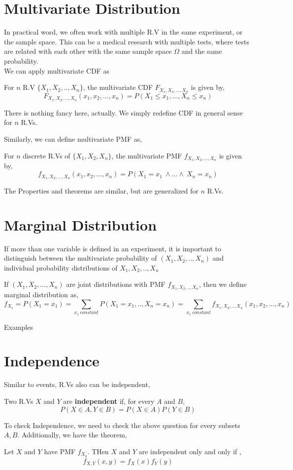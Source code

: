 \section{Multivariate Distribution}
In practical word, we often work with multiple R.V in the same experiment, or the sample space. This can be a medical research with multiple tests, where tests are related with each other with the same sample space $\Omega$ and the same probability.\\
We can apply multivariate CDF as
\begin{definition}
    For $n$  R.V $\{ X_1,X_2,..,X_n \}$, the multivariate CDF $F_{X_1,X_2,...,X_n}$ is given by,
    \[F_{X_1,X_2,...,X_n}(x_1,x_2,...,x_n) = P(X_1 \le x_1,...,X_n \le x_n) \]
\end{definition}
There is nothing fancy here, actually. We simply redefine CDF in general sense for $n$ R.Vs.
\par
Similarly, we can define multivariate PMF as,
\begin{definition} For $n$ discrete R.Vs of  $\{X_1,X_2,X_n\}$, the multivariate PMF  $f_{X_1,X_2,...,X_n}$ is given by,
    \[ f_{X_1,X_2,...,X_n}(x_1,x_2,...,x_n) = P(X_1=x_1 \ \land ... \land \ X_n = x_n) \]
\end{definition}

The Properties and theorems are similar, but are generalized for $n$ R.Vs.

\section{Marginal Distribution}
If more than one variable is defined in an experiment, it is important to distinguish between the multivariate probability of $(X_1,X_2,..,X_n)$ and individual probability distributions of $X_1,X_2,..,X_n$\\

\begin{definition}
    If $(X_1,X_2,...,X_n)$ are joint distributions with PMF $f_{X_1,X_2,..,X_n}$, then we define marginal distribution as,
    \[f_{X_1}= P(X_1 = x_1)= \sum_{x_1 \ constant} P(X_1=x_1,..,X_n=x_n)= \sum_{x_1\ constant} f_{X_1,X_2,..,X_n}(x_1,x_2,...,x_n)\]
\end{definition}
Examples 
\par
\lipsum[1-3]
\section{Independence}
Similar to events, R.Vs also can be independent,
\begin{definition}
    Two R.Vs $X$ and $Y$ are \textbf{independent} if, for every $A$ and $B$,
    \[P(X \in A, Y \in B)= P(X \in A)P(Y \in B)\]
\end{definition}
To check Independence, we need to check the above question for every subsets $A,B$. Additionally, we have the theorem,
\begin{theorem}
    Let $X$ and $Y$ have PMF $f_{X_y}$. THen $X$ and $Y$ are independent only and only if ,
    \[f_{X,Y}(x,y)=f_X(x)f_Y(y) \]
\end{theorem}

